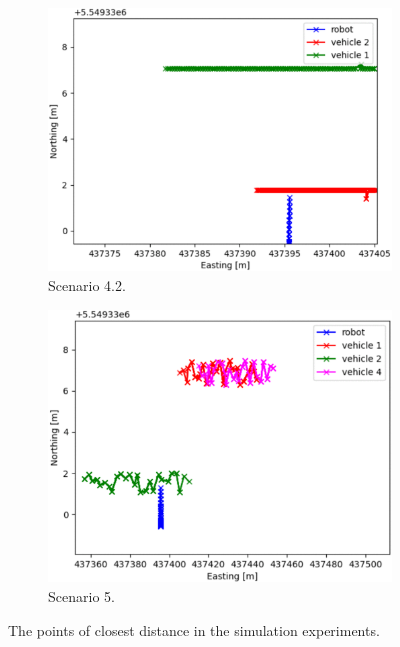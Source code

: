 \begin{figure}[H]
\begin{subfigure}{0.32\linewidth}
                \includegraphics[width=\linewidth]{images/simulations/closest_4_2.png}
                \caption{Scenario 4.2.}
            \end{subfigure}
            \begin{subfigure}{0.32\linewidth}
                \centering
                \includegraphics[width=\linewidth]{images/simulations/closest_5.png}
                \caption{Scenario 5.}
            \end{subfigure}
            \caption{The points of closest distance in the simulation experiments.}
        \end{figure}
